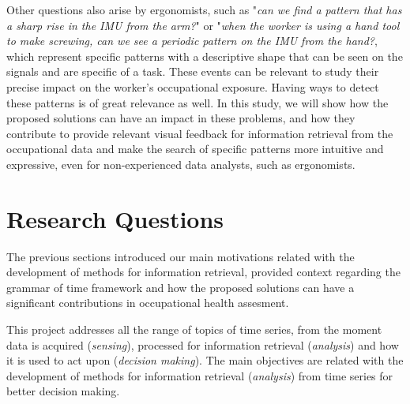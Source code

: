 Other questions also arise by ergonomists, such as "\textit{can we find a pattern that has a sharp rise in the IMU from the arm?}" or "\textit{when the worker is using a hand tool to make screwing, can we see a periodic pattern on the IMU from the hand?}, which represent specific patterns with a descriptive shape that can be seen on the signals and are specific of a task. These events can be relevant to study their precise impact on the worker's occupational exposure. Having ways to detect these patterns is of great relevance as well. In this study, we will show how the proposed solutions can have an impact in these problems, and how they contribute to provide relevant visual feedback for information retrieval from the occupational data and make the search of specific patterns more intuitive and expressive, even for non-experienced data analysts, such as ergonomists.


\section{Research Questions}

The previous sections introduced our main motivations related with the development of methods for information retrieval, provided context regarding the grammar of time framework and how the proposed solutions can have a significant contributions in occupational health assesment.
\par
This project addresses all the range of topics of time series, from the moment data is acquired (\textit{sensing}), processed for information retrieval (\textit{analysis}) and how it is used to act upon (\textit{decision making}). The main objectives are related with the development of methods for information retrieval (\textit{analysis}) from time series for better decision making.


